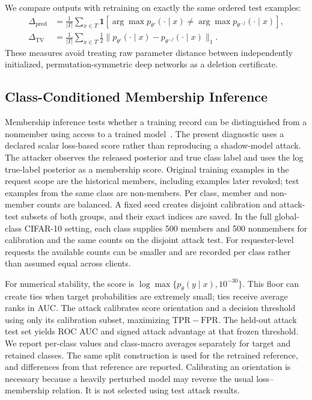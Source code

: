 \documentclass[software,article,submit,moreauthors]{Definitions/mdpi}
\begin{document}
We compare outputs with retraining on exactly the same ordered test examples:
\begin{align}
\Delta_{\mathrm{pred}}&=\frac1{|T|}\sum_{x\in T}
\mathbf{1}[\arg\max p_{\theta'}(\cdot\mid x)\ne
\arg\max p_{\theta^{-f}}(\cdot\mid x)],\\
\Delta_{\mathrm{TV}}&=\frac1{|T|}\sum_{x\in T}\frac12
\|p_{\theta'}(\cdot\mid x)-p_{\theta^{-f}}(\cdot\mid x)\|_1.
\end{align}
These measures avoid treating raw parameter distance between independently
initialized, permutation-symmetric deep networks as a deletion certificate.

\subsection{Class-Conditioned Membership Inference}
\label{sec:mia}
Membership inference tests whether a training record can be distinguished from
a nonmember using access to a trained model~\cite{ref24,ref25}. The present
diagnostic uses a declared scalar loss-based score rather than reproducing a
shadow-model attack. The attacker observes the released posterior and true class label and uses the
log true-label posterior as a membership score. Original training examples in
the request scope are the historical members, including examples later revoked;
test examples from the same class are non-members. Per class, member and
non-member counts are balanced. A fixed seed creates disjoint calibration and
attack-test subsets of both groups, and their exact indices are saved.
In the full global-class CIFAR-10 setting, each class supplies 500 members and
500 nonmembers for calibration and the same counts on the disjoint attack test.
For requester-level requests the available counts can be smaller and are
recorded per class rather than assumed equal across clients.

For numerical stability, the score is
$\log\max\{p_\theta(y\mid x),10^{-30}\}$. This floor can create ties when
target probabilities are extremely small; ties receive average ranks in AUC.
The attack calibrates score orientation and a decision threshold using only its
calibration subset, maximizing $\mathrm{TPR}-\mathrm{FPR}$. The held-out attack
test set yields ROC AUC and signed attack advantage at that frozen threshold.
We report per-class values and class-macro averages separately for target and
retained classes. The same split construction is used for the retrained
reference, and differences from that reference are reported. Calibrating an
orientation is necessary because a heavily perturbed model may reverse the
usual loss--membership relation. It is not selected using test attack results.
\end{document}
